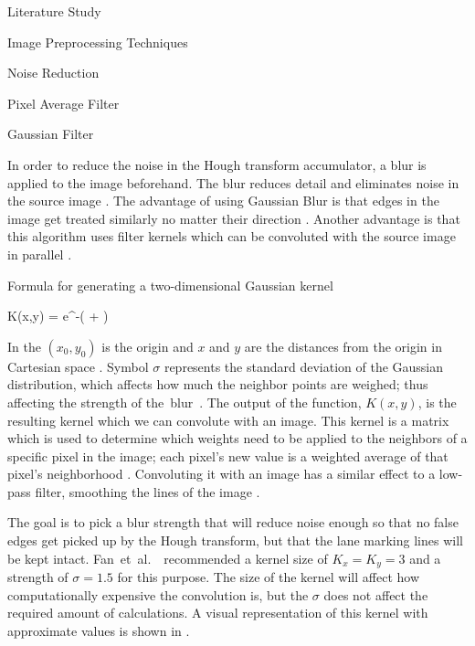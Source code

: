 \documentclass{matthijs}
\begin{document}
\begin{hoofdstuk}{Literature Study}
\begin{paragraaf}{Image Preprocessing Techniques}
\begin{subparagraaf}{Noise Reduction}
\begin{subsubparagraaf}{Pixel Average Filter}
				\end{subsubparagraaf}

				\begin{subsubparagraaf}{Gaussian Filter}

					In order to reduce the noise in the Hough transform accumulator, a blur is applied to the image beforehand.
					The blur reduces detail and eliminates noise in the source image \cite{fan2016faster}.
					The advantage of using Gaussian Blur is that edges in the image get treated similarly no matter their direction \cite{waltz1998efficient}.
					Another advantage is that this algorithm uses filter kernels which can be convoluted with the source image in parallel \cite{stroem2016parallel}.
					
					\begin{figuur}{Formula for generating a two-dimensional Gaussian kernel}

						\begin{largequation}
							K(x,y) = e^{-( + )}
						\end{largequation}\cite{gedraite2011investigation}
					
					\end{figuur}

					\bigskip

					In  the $ (x_0,y_0) $ is the origin and $x$ and $y$ are the distances from the origin in Cartesian space \cite{gedraite2011investigation}.
					Symbol $\sigma$ represents the standard deviation of the Gaussian distribution, which affects how much the neighbor points are weighed; thus affecting the strength of \mbox{the blur \cite{haddad1991class}.}
					The output of the function, $K(x,y)$, is the resulting kernel which we can convolute with an image.
					This kernel is a matrix which is used to determine which weights need to be applied to the neighbors of a specific pixel in the image; each pixel's new value is a weighted average of that pixel's neighborhood \cite{gedraite2011investigation}.
					Convoluting it with an image has a similar effect to a low-pass filter, smoothing the lines of the image \cite{haddad1991class}\cite{ferreira2010imagej}.

					\bigskip

					The goal is to pick a blur strength that will reduce noise enough so that no false edges get picked up by the Hough transform, but that the lane marking lines will be kept intact.
					\mbox{Fan et al. \cite{fan2016faster} recommended} a kernel size of $ K_x = K_y = 3 $ and a strength of $ \sigma = 1.5 $ for this purpose.
					The size of the kernel will affect how computationally expensive the convolution is, but the $\sigma$ does not affect the required amount of calculations.
					A visual representation of this kernel with approximate values is shown in .
					

\end{subsubparagraaf}
\end{subparagraaf}
\end{paragraaf}
\end{hoofdstuk}
\end{document}
